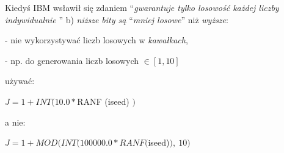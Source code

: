     \begin{frame}
	Kiedyś IBM wsławił się zdaniem ``{\it gwarantuje tylko losowość każdej liczby indywidualnie }''
    \newline
    \newline
	b) {\it niższe bity są} ``{\it mniej losowe}'' niż {\it wyższe}:

    - nie wykorzystywać liczb losowych w {\it kawałkach},

	- np. do generowania liczb losowych $\in[1, 10 ]$

	używać:

	$J=1+INT(10.0*$RANF (iseed) $)$

	a nie:

	$J=1+MOD(INT(100000.0*RANF($iseed)$),\ 10)$
    \end{frame}
